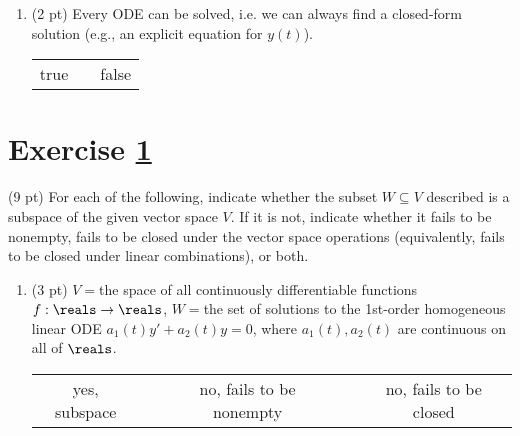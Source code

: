 \begin{enumerate}[resume,label=(\alph*)]
\item\label{itm : E1Q1e} (2 pt) Every ODE can be solved, i.e. we can always find a closed-form solution (e.g., an explicit equation for $y(t)$).
\begin{center}
\begin{tabular}{c c c}
true	&	\hspace{1in}	&	false
\end{tabular}
\end{center}
\end{enumerate}






%
%
%
%


\section{Exercise \ref{sec : Math211 Summer2019 Exam2 Q2}}
\label{sec : Math211 Summer2019 Exam2 Q2}

(9 pt) For each of the following, indicate whether the subset $W \subseteq V$ described is a subspace of the given vector space $V$. If it is not, indicate whether it fails to be nonempty, fails to be closed under the vector space operations (equivalently, fails to be closed under linear combinations), or both.
\begin{enumerate}[label=(\alph*)]
\item (3 pt) $V = {}$the space of all continuously differentiable functions $f : \reals \rightarrow \reals$, $W = {}$the set of solutions to the 1st-order homogeneous linear ODE $a_{1}(t) y' + a_{2}(t) y = 0$, where $a_{1}(t),a_{2}(t)$ are continuous on all of $\reals$.
\begin{center}
\begin{tabular}{c c c c c}
yes, subspace	&	\hspace{.35in}	&	no, fails to be nonempty	&	\hspace{.35in}	&	no, fails to be closed
\end{tabular}
\end{center}
\end{enumerate}




